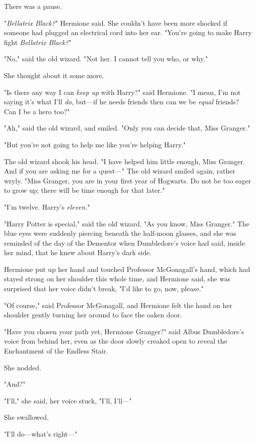 There was a pause.

"\emph{Bellatrix Black?}" Hermione said. She couldn't have been more shocked if
someone had plugged an electrical cord into her ear. "You're going to make
Harry fight \emph{Bellatrix Black?}"

"No," said the old wizard. "Not her. I cannot tell you who, or why."

She thought about it some more.

"Is there any way I can \emph{keep up} with Harry?" said Hermione. "I mean, I'm
not saying it's what I'll \emph{do}, but---if he needs friends then can we be
\emph{equal} friends? Can I be a hero too?"

"Ah," said the old wizard, and smiled. "Only you can decide that, Miss Granger."

"But you're not going to help me like you're helping Harry."

The old wizard shook his head. "I have helped him little enough, Miss Granger.
And if you are asking me for a quest---" The old wizard smiled again, rather
wryly. "Miss Granger, you are in your first year of Hogwarts. Do not be too
eager to grow up; there will be time enough for that later."

"I'm twelve. Harry's \emph{eleven.}"

"Harry Potter is special," said the old wizard. "As you know, Miss Granger."
The blue eyes were suddenly piercing beneath the half-moon glasses, and she was
reminded of the day of the Dementor when Dumbledore's voice had said, inside
her mind, that he knew about Harry's dark side.

Hermione put up her hand and touched Professor McGonagall's hand, which had
stayed strong on her shoulder this whole time, and Hermione said, she was
surprised that her voice didn't break, "I'd like to go, now, please."

"Of course," said Professor McGonagall, and Hermione felt the hand on her
shoulder gently turning her around to face the oaken door.

"Have you chosen your path yet, Hermione Granger?" said Albus Dumbledore's
voice from behind her, even as the door slowly creaked open to reveal the
Enchantment of the Endless Stair.

She nodded.

"And?"

"I'll," she said, her voice stuck, "I'll, I'll---"

She swallowed.

"I'll do---what's right---"

